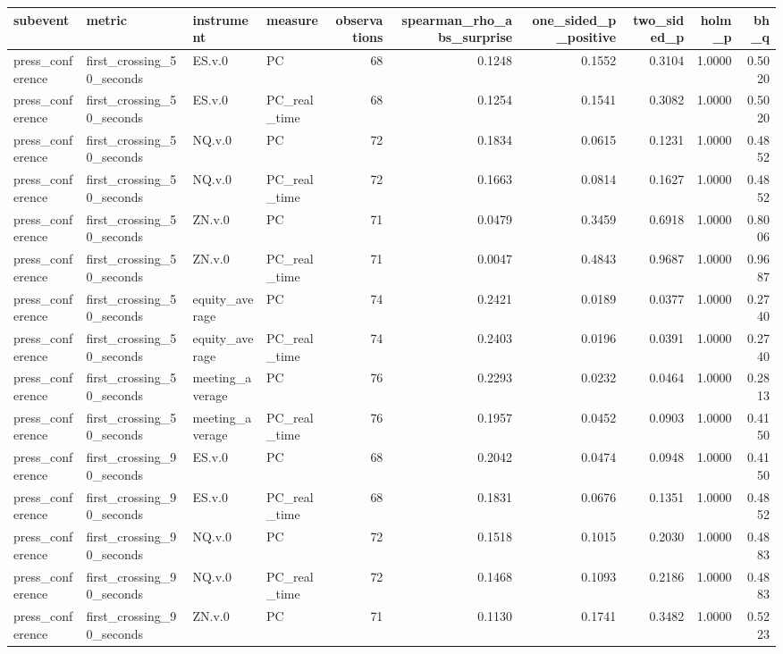 \begin{tabular}{llllrrrrrr}
\toprule
subevent & metric & instrument & measure & observations & spearman_rho_abs_surprise & one_sided_p_positive & two_sided_p & holm_p & bh_q \\
\midrule
press_conference & first_crossing_50_seconds & ES.v.0 & PC & 68 & 0.1248 & 0.1552 & 0.3104 & 1.0000 & 0.5020 \\
press_conference & first_crossing_50_seconds & ES.v.0 & PC_real_time & 68 & 0.1254 & 0.1541 & 0.3082 & 1.0000 & 0.5020 \\
press_conference & first_crossing_50_seconds & NQ.v.0 & PC & 72 & 0.1834 & 0.0615 & 0.1231 & 1.0000 & 0.4852 \\
press_conference & first_crossing_50_seconds & NQ.v.0 & PC_real_time & 72 & 0.1663 & 0.0814 & 0.1627 & 1.0000 & 0.4852 \\
press_conference & first_crossing_50_seconds & ZN.v.0 & PC & 71 & 0.0479 & 0.3459 & 0.6918 & 1.0000 & 0.8006 \\
press_conference & first_crossing_50_seconds & ZN.v.0 & PC_real_time & 71 & 0.0047 & 0.4843 & 0.9687 & 1.0000 & 0.9687 \\
press_conference & first_crossing_50_seconds & equity_average & PC & 74 & 0.2421 & 0.0189 & 0.0377 & 1.0000 & 0.2740 \\
press_conference & first_crossing_50_seconds & equity_average & PC_real_time & 74 & 0.2403 & 0.0196 & 0.0391 & 1.0000 & 0.2740 \\
press_conference & first_crossing_50_seconds & meeting_average & PC & 76 & 0.2293 & 0.0232 & 0.0464 & 1.0000 & 0.2813 \\
press_conference & first_crossing_50_seconds & meeting_average & PC_real_time & 76 & 0.1957 & 0.0452 & 0.0903 & 1.0000 & 0.4150 \\
press_conference & first_crossing_90_seconds & ES.v.0 & PC & 68 & 0.2042 & 0.0474 & 0.0948 & 1.0000 & 0.4150 \\
press_conference & first_crossing_90_seconds & ES.v.0 & PC_real_time & 68 & 0.1831 & 0.0676 & 0.1351 & 1.0000 & 0.4852 \\
press_conference & first_crossing_90_seconds & NQ.v.0 & PC & 72 & 0.1518 & 0.1015 & 0.2030 & 1.0000 & 0.4883 \\
press_conference & first_crossing_90_seconds & NQ.v.0 & PC_real_time & 72 & 0.1468 & 0.1093 & 0.2186 & 1.0000 & 0.4883 \\
press_conference & first_crossing_90_seconds & ZN.v.0 & PC & 71 & 0.1130 & 0.1741 & 0.3482 & 1.0000 & 0.5223 \\

\end{tabular}
